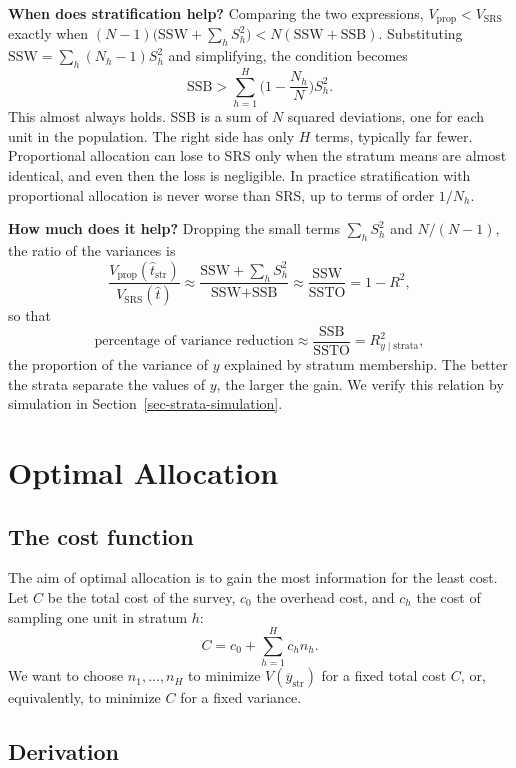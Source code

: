 \documentclass[
  letterpaper,
  DIV=11,
  numbers=noendperiod]{scrreprt}
\renewcommand{\[}{\begin{equation}}
\renewcommand{\]}{\end{equation}}
\begin{document}
\textbf{When does stratification help?} Comparing the two expressions,
\(V_{\text{prop}} < V_{\text{SRS}}\) exactly when
\((N-1)\big(\text{SSW} + \sum_h S_h^2\big) < N(\text{SSW}+\text{SSB})\).
Substituting \(\text{SSW} = \sum_h(N_h-1)S_h^2\) and simplifying, the
condition becomes \[
\text{SSB} > \sum_{h=1}^H \Big(1-\frac{N_h}{N}\Big)S_h^2 .
\] This almost always holds. SSB is a sum of \(N\) squared deviations,
one for each unit in the population. The right side has only \(H\)
terms, typically far fewer. Proportional allocation can lose to SRS only
when the stratum means are almost identical, and even then the loss is
negligible. In practice stratification with proportional allocation is
never worse than SRS, up to terms of order \(1/N_h\).

\textbf{How much does it help?} Dropping the small terms
\(\sum_h S_h^2\) and \(N/(N-1)\), the ratio of the variances is \[
\frac{V_{\text{prop}}(\hat t_{\text{str}})}{V_{\text{SRS}}(\hat t)}
 \approx \frac{\text{SSW}+\sum_h S_h^2}{\text{SSW}+\text{SSB}} \approx \frac{\text{SSW}}{\text{SSTO}} = 1 - R^2,
\] so that \[
\boxed{\text{percentage of variance reduction} \approx \frac{\text{SSB}}{\text{SSTO}} = R^2_{y\mid\text{strata}}},
\] the proportion of the variance of \(y\) explained by stratum
membership. The better the strata separate the values of \(y\), the
larger the gain. We verify this relation by simulation in
Section~\ref{sec-strata-simulation}.

\section{Optimal Allocation}\label{sec-strata-optimal}

\subsection{The cost function}\label{the-cost-function}

The aim of optimal allocation is to gain the most information for the
least cost. Let \(C\) be the total cost of the survey, \(c_0\) the
overhead cost, and \(c_h\) the cost of sampling one unit in stratum
\(h\): \[
C = c_0 + \sum_{h=1}^H c_h n_h .
\] We want to choose \(n_1,\ldots,n_H\) to minimize
\(V(\overline y_{\text{str}})\) for a fixed total cost \(C\), or,
equivalently, to minimize \(C\) for a fixed variance.

\subsection{Derivation}\label{derivation}
\end{document}
